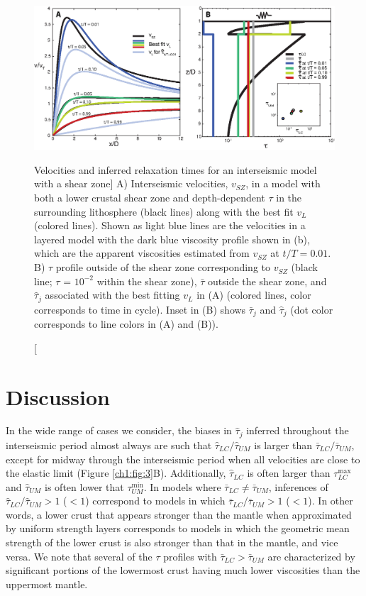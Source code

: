 \begin{figure}
\includegraphics{ch1/figures/Figure4.eps}
\caption
[Velocities and inferred relaxation times for an interseismic model with
a shear zone]
{A) Interseismic velocities, $v_{SZ}$, in a model with both a lower
crustal shear zone and depth-dependent $\tau$ in the surrounding
lithosphere (black lines) along with the best fit $v_{L}$ (colored
lines).  Shown as light blue lines are the velocities in a layered
model with the dark blue viscosity profile shown in (b), which are the
apparent viscosities estimated from $v_{SZ}$ at $t/T = 0.01$.  B)
$\tau$ profile outside of the shear zone corresponding to $v_{SZ}$
(black line; $\tau$ = $10^{-2}$ within the shear zone), $\bar{\tau}$
outside the shear zone, and $\hat{\tau}_j$ associated with the best
fitting $v_{L}$ in (A) (colored lines, color corresponds to time in
cycle). Inset in (B) shows $\bar{\tau}_j$ and $\hat{\tau}_j$ (dot
color corresponds to line colors in (A) and (B)).}
\label{ch1:fig:4}
\end{figure}

\section{Discussion}
In the wide range of cases we consider, the biases in $\hat{\tau}_j$
inferred throughout the interseismic period almost always are such
that $\hat{\tau}_{LC}/\hat{\tau}_{UM}$ is larger than
$\bar{\tau}_{LC}/\bar{\tau}_{UM}$, except for midway through the
interseismic period when all velocities are close to the elastic limit
(Figure \ref{ch1:fig:3}B).  Additionally, $\hat{\tau}_{LC}$ is often
larger than $\tau^{\max}_{LC}$ and $\hat{\tau}_{UM}$ is often lower
that $\tau^{\min}_{UM}$.  In models where $\bar{\tau}_{LC} \ne
\bar{\tau}_{UM}$, inferences of $\hat{\tau}_{LC}/\hat{\tau}_{UM}>1$
($<1$) correspond to models in which
$\bar{\tau}_{LC}/\bar{\tau}_{UM}>1$ ($<1$). In other words, a lower
crust that appears stronger than the mantle when approximated by
uniform strength layers corresponds to models in which the geometric
mean strength of the lower crust is also stronger than that in the
mantle, and vice versa.  We note that several of the $\tau$ profiles
with $\bar{\tau}_{LC} > \bar{\tau}_{UM}$ are characterized by
significant portions of the lowermost crust having much lower
viscosities than the uppermost mantle.

